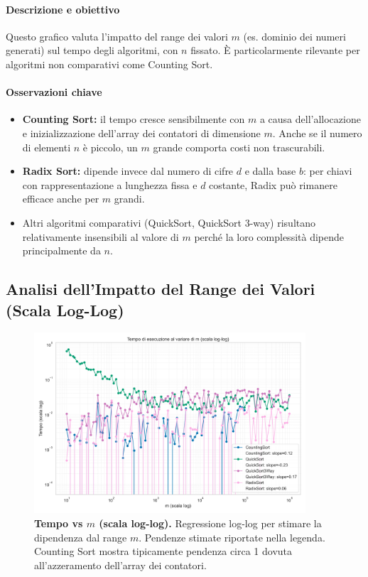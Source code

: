 \documentclass[a4paper, 11pt]{article}
\begin{document}
\paragraph{Descrizione e obiettivo}
Questo grafico valuta l'impatto del range dei valori \(m\) (es. dominio dei numeri generati) sul tempo degli algoritmi, con \(n\) fissato. È particolarmente rilevante per algoritmi non comparativi come Counting Sort.

\paragraph{Osservazioni chiave}
\begin{itemize}
  \item \textbf{Counting Sort:} il tempo cresce sensibilmente con \(m\) a causa dell'allocazione e inizializzazione dell'array dei contatori di dimensione \(m\). Anche se il numero di elementi \(n\) è piccolo, un \(m\) grande comporta costi non trascurabili.
  \item \textbf{Radix Sort:} dipende invece dal numero di cifre \(d\) e dalla base \(b\): per chiavi con rappresentazione a lunghezza fissa e \(d\) costante, Radix può rimanere efficace anche per \(m\) grandi.
  \item Altri algoritmi comparativi (QuickSort, QuickSort 3-way) risultano relativamente insensibili al valore di \(m\) perché la loro complessità dipende principalmente da \(n\).
\end{itemize}

\subsection{Analisi dell'Impatto del Range dei Valori (Scala Log-Log)}
\begin{figure}[H]
\centering
\includegraphics[width=0.9\textwidth]{./Immagini/tempo_vs_m_loglog_improved.png}
\caption*{\textbf{Tempo vs \(m\) (scala log-log).} Regressione log-log per stimare la dipendenza dal range \(m\). Pendenze stimate riportate nella legenda. Counting Sort mostra tipicamente pendenza circa 1 dovuta all'azzeramento dell'array dei contatori.}
\label{fig:variazione_m_log}
\end{figure}
\end{document}
